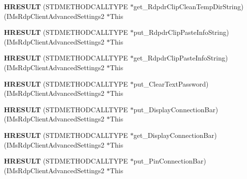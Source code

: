 \begin{DoxyCompactItemize}
{\bfseries H\+R\+E\+S\+U\+LT} (S\+T\+D\+M\+E\+T\+H\+O\+D\+C\+A\+L\+L\+T\+Y\+PE $\ast$get\+\_\+\+Rdpdr\+Clip\+Clean\+Temp\+Dir\+String)(I\+Ms\+Rdp\+Client\+Advanced\+Settings2 $\ast$This
\item 
\mbox{\label{struct_i_ms_rdp_client_advanced_settings2_vtbl_aa0659e34cc3838d65916361d5a5acb8e}} 
{\bfseries H\+R\+E\+S\+U\+LT} (S\+T\+D\+M\+E\+T\+H\+O\+D\+C\+A\+L\+L\+T\+Y\+PE $\ast$put\+\_\+\+Rdpdr\+Clip\+Paste\+Info\+String)(I\+Ms\+Rdp\+Client\+Advanced\+Settings2 $\ast$This
\item 
\mbox{\label{struct_i_ms_rdp_client_advanced_settings2_vtbl_a256fde40b4b8ff6ae25f6640686b39be}} 
{\bfseries H\+R\+E\+S\+U\+LT} (S\+T\+D\+M\+E\+T\+H\+O\+D\+C\+A\+L\+L\+T\+Y\+PE $\ast$get\+\_\+\+Rdpdr\+Clip\+Paste\+Info\+String)(I\+Ms\+Rdp\+Client\+Advanced\+Settings2 $\ast$This
\item 
\mbox{\label{struct_i_ms_rdp_client_advanced_settings2_vtbl_a5d675dcdd31559cf48a3a83787ff6e80}} 
{\bfseries H\+R\+E\+S\+U\+LT} (S\+T\+D\+M\+E\+T\+H\+O\+D\+C\+A\+L\+L\+T\+Y\+PE $\ast$put\+\_\+\+Clear\+Text\+Password)(I\+Ms\+Rdp\+Client\+Advanced\+Settings2 $\ast$This
\item 
\mbox{\label{struct_i_ms_rdp_client_advanced_settings2_vtbl_a94c2ab24cd229106e332700a479e312c}} 
{\bfseries H\+R\+E\+S\+U\+LT} (S\+T\+D\+M\+E\+T\+H\+O\+D\+C\+A\+L\+L\+T\+Y\+PE $\ast$put\+\_\+\+Display\+Connection\+Bar)(I\+Ms\+Rdp\+Client\+Advanced\+Settings2 $\ast$This
\item 
\mbox{\label{struct_i_ms_rdp_client_advanced_settings2_vtbl_a31f4163c01247afa20abf6b46e9df2f1}} 
{\bfseries H\+R\+E\+S\+U\+LT} (S\+T\+D\+M\+E\+T\+H\+O\+D\+C\+A\+L\+L\+T\+Y\+PE $\ast$get\+\_\+\+Display\+Connection\+Bar)(I\+Ms\+Rdp\+Client\+Advanced\+Settings2 $\ast$This
\item 
\mbox{\label{struct_i_ms_rdp_client_advanced_settings2_vtbl_a06aa57357a5ec909b7a1c2c3cc0bb63a}} 
{\bfseries H\+R\+E\+S\+U\+LT} (S\+T\+D\+M\+E\+T\+H\+O\+D\+C\+A\+L\+L\+T\+Y\+PE $\ast$put\+\_\+\+Pin\+Connection\+Bar)(I\+Ms\+Rdp\+Client\+Advanced\+Settings2 $\ast$This

\end{DoxyCompactItemize}
